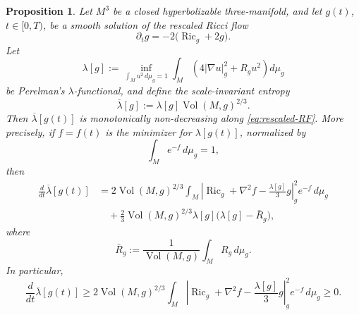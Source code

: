 \documentclass{amsart}
\newtheorem{proposition}{Proposition}[section]
\begin{document}
\begin{proposition}
\label{monotonicity}
Let \(M^{3}\) be a closed hyperbolizable three-manifold, and let
\(g(t)\), \(t\in[0,T)\), be a smooth solution of the rescaled Ricci flow
\begin{equation}
\label{eq:rescaled-RF}
        \partial_t g=-2\bigl(\operatorname{Ric}_{g}+2g\bigr).
\end{equation}
Let
\begin{equation}
\label{eq:lambda-functional}
        \lambda[g]
        :=
        \inf_{\int_M u^2\,d\mu_g=1}
        \int_M
        \left(
                4|\nabla u|_g^2+R_g u^2
        \right)
        d\mu_g
\end{equation}
be Perelman's \(\lambda\)-functional, and define the scale-invariant entropy
\begin{equation}
\label{eq:scaled-lambda}
        \overline{\lambda}[g]
        :=
        \lambda[g]\operatorname{Vol}(M,g)^{2/3}.
\end{equation}
Then \(\overline{\lambda}[g(t)]\) is monotonically non-decreasing along
\eqref{eq:rescaled-RF}. More precisely, if \(f=f(t)\) is the minimizer for
\(\lambda[g(t)]\), normalized by
\begin{equation}
\label{eq:f-normalization}
        \int_M e^{-f}\,d\mu_g=1,
\end{equation}
then
\begin{equation}
\label{eq:scaled-lambda-monotonicity}
\begin{aligned}
        \frac{d}{dt}\overline{\lambda}[g(t)]
        &=
        2\operatorname{Vol}(M,g)^{2/3}
        \int_M
        \left|
                \operatorname{Ric}_g+\nabla^2 f
                -
                \frac{\lambda[g]}{3}g
        \right|_g^2
        e^{-f}\,d\mu_g        \\
        &\quad
        +
        \frac{2}{3}\operatorname{Vol}(M,g)^{2/3}
        \lambda[g]\bigl(\lambda[g]-\bar R_g\bigr),
\end{aligned}
\end{equation}
where
\begin{equation}
\label{eq:average-scalar-curvature}
        \bar R_g
        :=
        \frac{1}{\operatorname{Vol}(M,g)}
        \int_M R_g\,d\mu_g .
\end{equation}
In particular,
\begin{equation}
\label{eq:monotonic1}
        \frac{d}{dt}\overline{\lambda}[g(t)]\geq 2\operatorname{Vol}(M,g)^{2/3}
        \int_M
        \left|
                \operatorname{Ric}_g+\nabla^2 f
                -
                \frac{\lambda[g]}{3}g
        \right|_g^2
        e^{-f}\,d\mu_g  \geq 0.
\end{equation}
\end{proposition}
\end{document}
